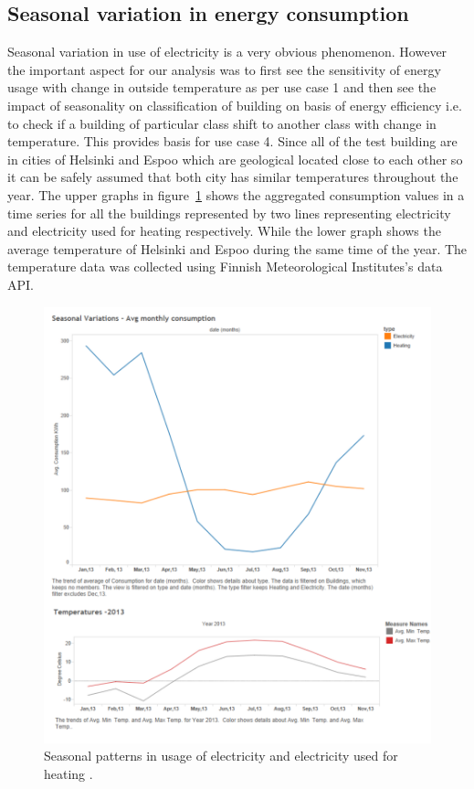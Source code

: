 \subsection{Seasonal variation in energy consumption}
Seasonal variation in use of electricity is a very obvious phenomenon. However the important aspect for our analysis was to first see the sensitivity of energy usage with change in outside temperature as per use case 1 and then see the impact of seasonality on classification of building on basis of energy efficiency i.e. to check if a building of particular class shift to another class with change in temperature. This provides basis for use case 4. Since all of the test building are in cities of Helsinki and Espoo which are geological located close to each other so it can be safely assumed that both city has similar temperatures throughout the year. The upper graphs in figure~\ref{fig:season} shows the aggregated consumption values in a time series for all the buildings represented by two lines representing electricity and electricity used for heating respectively. While the lower graph shows the average temperature of Helsinki and Espoo during the same time of the year. The temperature data was collected using Finnish Meteorological Institutes's data API.       
 
\begin{figure}[!ht]
    \begin{center}
      \includegraphics[scale = 0.7]{images/season.pdf}
      \caption{Seasonal patterns in usage of electricity and electricity used for heating .}
      \label{fig:season}
    \end{center}
  \end{figure} 

